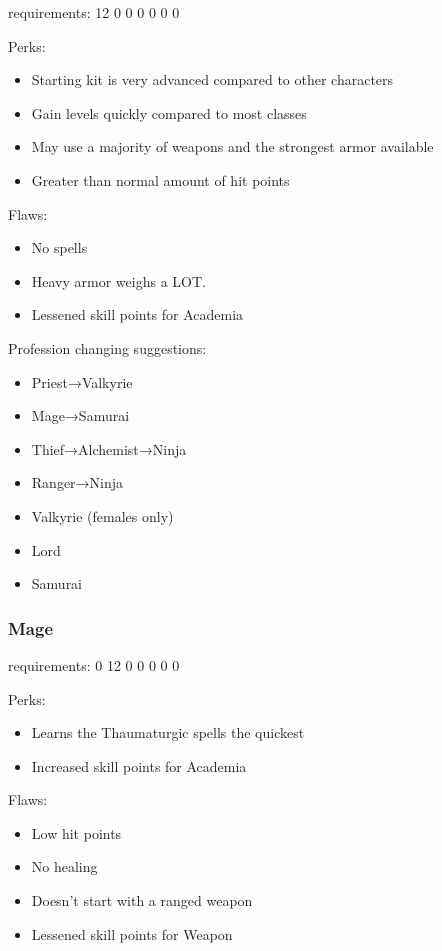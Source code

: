 \documentclass[12pt]{article}
\begin{document}
requirements: 12 0 0 0 0 0 0

Perks:

\begin{itemize}
\item
  Starting kit is very advanced compared to other characters
\item
  Gain levels quickly compared to most classes
\item
  May use a majority of weapons and the strongest armor available
\item
  Greater than normal amount of hit points
\end{itemize}

Flaws:

\begin{itemize}
\item
  No spells
\item
  Heavy armor weighs a LOT.
\item
  Lessened skill points for Academia
\end{itemize}

Profession changing suggestions:

\begin{itemize}
\item
  Priest→Valkyrie
\item
  Mage→Samurai
\item
  Thief→Alchemist→Ninja
\item
  Ranger→Ninja
\item
  Valkyrie (females only)
\item
  Lord
\item
  Samurai
\end{itemize}

\subsubsection{Mage}\label{mage}

requirements: 0 12 0 0 0 0 0

Perks:

\begin{itemize}
\item
  Learns the Thaumaturgic spells the quickest
\item
  Increased skill points for Academia
\end{itemize}

Flaws:

\begin{itemize}
\item
  Low hit points
\item
  No healing
\item
  Doesn't start with a ranged weapon
\item
  Lessened skill points for Weapon
\end{itemize}
\end{document}

